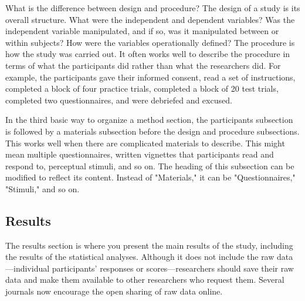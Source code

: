 What is the difference between design and procedure? The design of a study is its overall structure. What were the independent and dependent variables? Was the independent variable manipulated, and if so, was it manipulated between or within subjects? How were the variables operationally defined? The procedure is how the study was carried out. It often works well to describe the procedure in terms of what the participants did rather than what the researchers did. For example, the participants gave their informed consent, read a set of instructions, completed a block of four practice trials, completed a block of 20 test trials, completed two questionnaires, and were debriefed and excused.




In the third basic way to organize a method section, the participants subsection is followed by a materials subsection before the design and procedure subsections. This works well when there are complicated materials to describe. This might mean multiple questionnaires, written vignettes that participants read and respond to, perceptual stimuli, and so on. The heading of this subsection can be modified to reflect its content. Instead of "Materials," it can be "Questionnaires," "Stimuli," and so on.




\subsection{Results}



The results section is where you present the main results of the study, including the results of the statistical analyses. Although it does not include the raw data---individual participants' responses or scores---researchers should save their raw data and make them available to other researchers who request them. Several journals now encourage the open sharing of raw data online.




